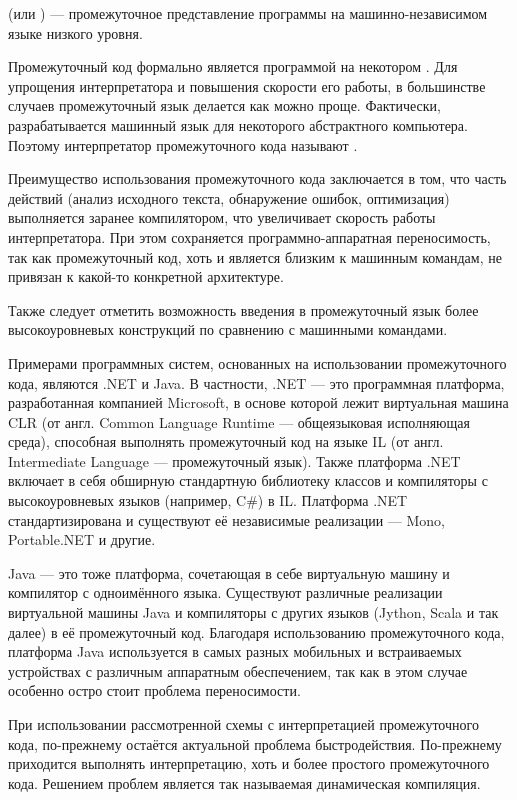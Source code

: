 \begin{defn}
   (или
  ) — промежуточное представление программы
  на машинно-независимом языке низкого уровня.
\end{defn}

Промежуточный код формально является программой на некотором
. Для упрощения
интерпретатора и повышения скорости его работы, в большинстве случаев
промежуточный язык делается как можно проще.  Фактически,
разрабатывается машинный язык для некоторого абстрактного
компьютера. Поэтому интерпретатор промежуточного кода называют
.

Преимущество использования промежуточного кода заключается в том, что
часть действий (анализ исходного текста, обнаружение ошибок,
оптимизация) выполняется заранее компилятором, что увеличивает
скорость работы интерпретатора. При этом сохраняется
программно-аппаратная переносимость, так как промежуточный код, хоть и
является близким к машинным командам, не привязан к какой-то
конкретной архитектуре.

Также следует отметить возможность введения в промежуточный язык более
высокоуровневых конструкций по сравнению с машинными командами.

Примерами программных систем, основанных на использовании
промежуточного кода, являются .NET и Java. В частности, .NET — это
программная платформа, разработанная компанией Microsoft, в основе
которой лежит виртуальная машина CLR (от англ. Common Language Runtime
— общеязыковая исполняющая среда), способная выполнять промежуточный
код на языке IL (от англ.  Intermediate Language — промежуточный
язык). Также платформа .NET включает в себя обширную стандартную
библиотеку классов и компиляторы с высокоуровневых языков (например,
C\#) в IL. Платформа .NET стандартизирована и существуют её
независимые реализации — Mono, Portable.NET и другие.

Java — это тоже платформа, сочетающая в себе виртуальную машину и
компилятор с одноимённого языка. Существуют различные реализации
виртуальной машины Java и компиляторы с других языков (Jython, Scala и
так далее) в её промежуточный код. Благодаря использованию
промежуточного кода, платформа Java используется в самых разных
мобильных и встраиваемых устройствах с различным аппаратным
обеспечением, так как в этом случае особенно остро стоит проблема
переносимости.

При использовании рассмотренной схемы с интерпретацией промежуточного
кода, по-прежнему остаётся актуальной проблема
быстродействия. По-прежнему приходится выполнять интерпретацию, хоть и
более простого промежуточного кода. Решением проблем является так
называемая динамическая компиляция.

